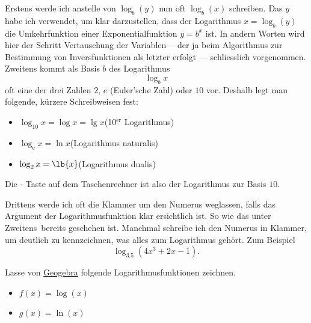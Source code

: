 \documentclass[%
11pt,%
twoside,%
titlepage,%
german,%
headsepline%
]{scrartcl}
\begin{document}
Erstens werde ich anstelle von $\log_b(y)$ nun oft $\log_b(x)$ schreiben. Das $y$ habe ich verwendet, um klar darzustellen, dass der Logarithmus $x=\log_b(y)$ die Umkehrfunktion einer Exponential\-funktion $y=b^x$ ist. In andern Worten wird hier der Schritt \glqq Vertauschung der Variablen\grqq --- der ja beim Algorithmus zur Bestimmung von Inversfunktionen als letzter erfolgt ---  schliesslich vorgenommen.
Zweitens kommt als Basis $b$ des Logarithmus
$$\log_bx$$
oft eine der drei Zahlen $2$, $e$ (Euler'sche Zahl) oder $10$ vor. Deshalb legt man folgende,
kürzere Schreibweisen fest:
\begin{itemize}
  \item $\log_{10}x=\log{x}=\lg x$\hfill(10$^{\text{er}}$ Logarithmus)
  \item $\log_\mathrm{e}{x}=\ln{x}$\hfill(Logarithmus naturalis)
  \item $\log_2{x}=\lb{x}$\hfill(Logarithmus dualis)
\end{itemize}
\begin{bem}
  Die  - Taste auf dem Taschenrechner ist also der
  Logarithmus zur Basis $10$.
\end{bem}
Drittens werde ich oft die Klammer um den Numerus weglassen, falls das Argument der Logarithmusfunktion klar ersichtlich ist. So wie das unter \glqq Zweitens\grqq\ bereits geschehen ist. Manchmal schreibe ich den Numerus in Klammer, um deutlich zu
kennzeichnen, was alles zum Logarithmus gehört. Zum Beispiel
$$\log_{3.5}(4x^3+2x-1).$$

\begin{ueb}[Graphen]
Lasse von \href{geogebra.org}{Geogebra} folgende Logarithmusfunktionen zeichnen.
\begin{itemize}
\item $f(x) = \log (x)$
\item $g(x) = \ln (x)$
\end{itemize}
\end{ueb}
\end{document}
